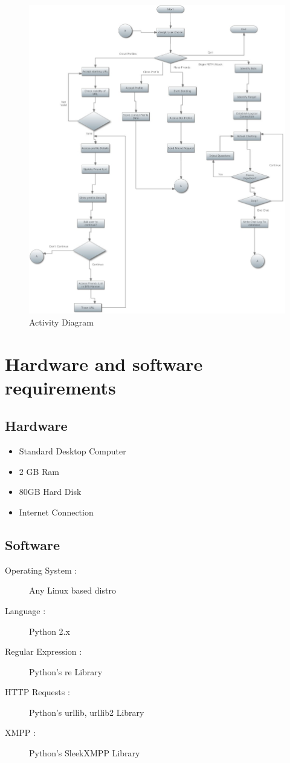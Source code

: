 \begin{figure}[H]
\centering
\includegraphics[scale=0.45]{project/diagrams/activity}
\caption{Activity Diagram}
\label{fig:activity}
\end{figure}


\section{Hardware and software requirements}
\subsection{Hardware}

\begin{itemize}
\item{Standard Desktop Computer}
\item{2 GB Ram}
\item{80GB Hard Disk}
\item{Internet Connection}
\end{itemize}
\subsection{Software}

\begin{description}
\item[Operating System : ]  Any Linux based distro
\item[Language : ] Python 2.x
\item[Regular Expression : ] Python's re Library
\item[HTTP Requests : ] Python's urllib, urllib2 Library
\item[XMPP : ] Python's SleekXMPP Library
\end{description}

